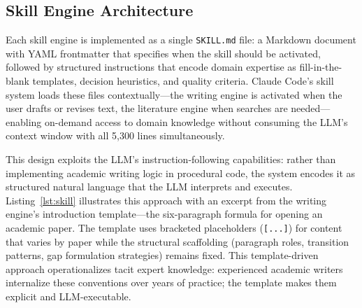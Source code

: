 \documentclass{article}
\begin{document}
\subsection{Skill Engine Architecture}\label{sec:skill_engines}

Each skill engine is implemented as a single \texttt{SKILL.md} file: a Markdown document with YAML frontmatter that specifies when the skill should be activated, followed by structured instructions that encode domain expertise as fill-in-the-blank templates, decision heuristics, and quality criteria. Claude Code's skill system loads these files contextually---the writing engine is activated when the user drafts or revises text, the literature engine when searches are needed---enabling on-demand access to domain knowledge without consuming the LLM's context window with all 5,300 lines simultaneously.

This design exploits the LLM's instruction-following capabilities: rather than implementing academic writing logic in procedural code, the system encodes it as structured natural language that the LLM interprets and executes. Listing~\ref{lst:skill} illustrates this approach with an excerpt from the writing engine's introduction template---the six-paragraph formula for opening an academic paper. The template uses bracketed placeholders (\texttt{[...]}) for content that varies by paper while the structural scaffolding (paragraph roles, transition patterns, gap formulation strategies) remains fixed. This template-driven approach operationalizes tacit expert knowledge: experienced academic writers internalize these conventions over years of practice; the template makes them explicit and LLM-executable.
\end{document}
